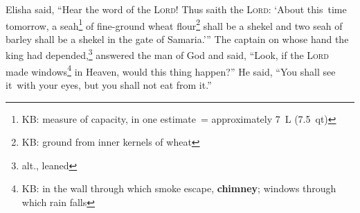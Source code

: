 
\begin{inparaenum}
     Elisha said, ``Hear the word of the \textsc{Lord}! Thus saith the \textsc{Lord}: `About this\understood\ time tomorrow, a seah\footnote{KB: measure of capacity, in one estimate~= approximately 7~L (7.5~qt)} of fine-ground wheat flour\footnote{KB: ground from inner kernels of wheat} shall be a shekel and two seah of barley shall be a shekel in the gate of Samaria.'\thinspace''%
     The captain on whose hand the king had depended,\footnote{alt., leaned} answered the man of God and said, ``Look, if the \textsc{Lord} made windows\footnote{KB: in the wall through which smoke escape, \textbf{chimney}; windows through which rain falls} in Heaven, would this thing happen?'' He said, ``You shall see it\understood\ with your eyes, but you shall not eat from it.''%
    

\end{inparaenum}
